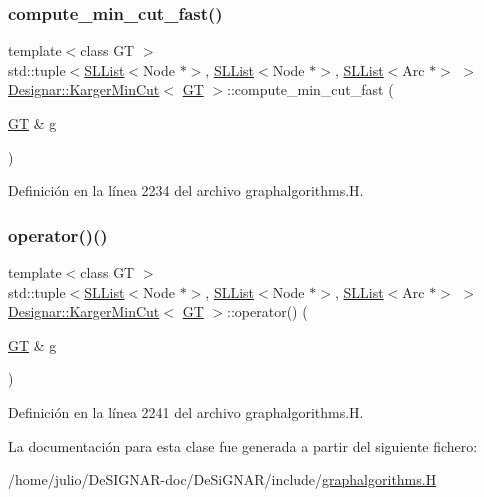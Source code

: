 \subsubsection{\texorpdfstring{compute\+\_\+min\+\_\+cut\+\_\+fast()}{compute\_min\_cut\_fast()}}
{\footnotesize\ttfamily template$<$class GT $>$ \\
std\+::tuple$<$\hyperlink{class_designar_1_1_s_l_list}{S\+L\+List}$<$Node $\ast$$>$, \hyperlink{class_designar_1_1_s_l_list}{S\+L\+List}$<$Node $\ast$$>$, \hyperlink{class_designar_1_1_s_l_list}{S\+L\+List}$<$Arc $\ast$$>$ $>$ \hyperlink{class_designar_1_1_karger_min_cut}{Designar\+::\+Karger\+Min\+Cut}$<$ \hyperlink{demo-buildgraph_8_c_a3001c40d2c31ca87ed96cd7d1334a55e}{GT} $>$\+::compute\+\_\+min\+\_\+cut\+\_\+fast (\begin{DoxyParamCaption}\item[{\hyperlink{demo-buildgraph_8_c_a3001c40d2c31ca87ed96cd7d1334a55e}{GT} \&}]{g }\end{DoxyParamCaption})\hspace{0.3cm}{\ttfamily [inline]}}



Definición en la línea 2234 del archivo graphalgorithms.\+H.

\mbox{\label{class_designar_1_1_karger_min_cut_a733802123d2510126abd4238688432ca}} 
\subsubsection{\texorpdfstring{operator()()}{operator()()}}
{\footnotesize\ttfamily template$<$class GT $>$ \\
std\+::tuple$<$\hyperlink{class_designar_1_1_s_l_list}{S\+L\+List}$<$Node $\ast$$>$, \hyperlink{class_designar_1_1_s_l_list}{S\+L\+List}$<$Node $\ast$$>$, \hyperlink{class_designar_1_1_s_l_list}{S\+L\+List}$<$Arc $\ast$$>$ $>$ \hyperlink{class_designar_1_1_karger_min_cut}{Designar\+::\+Karger\+Min\+Cut}$<$ \hyperlink{demo-buildgraph_8_c_a3001c40d2c31ca87ed96cd7d1334a55e}{GT} $>$\+::operator() (\begin{DoxyParamCaption}\item[{\hyperlink{demo-buildgraph_8_c_a3001c40d2c31ca87ed96cd7d1334a55e}{GT} \&}]{g }\end{DoxyParamCaption})\hspace{0.3cm}{\ttfamily [inline]}}



Definición en la línea 2241 del archivo graphalgorithms.\+H.



La documentación para esta clase fue generada a partir del siguiente fichero\+:\begin{DoxyCompactItemize}
\item 
/home/julio/\+De\+S\+I\+G\+N\+A\+R-\/doc/\+De\+Si\+G\+N\+A\+R/include/\hyperlink{graphalgorithms_8_h}{graphalgorithms.\+H}\end{DoxyCompactItemize}
